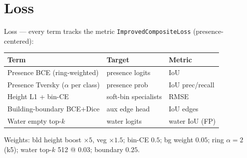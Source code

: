 \documentclass[aspectratio=169,11pt]{beamer}
\newcommand{\code}[1]{\texttt{\small #1}}
\begin{document}
\section{Loss}

\begin{frame}{Loss --- every term tracks the metric}
  \code{ImprovedCompositeLoss} (presence-centered):
  \begin{center}\small
  \begin{tabular}{lll}
    \toprule
    Term & Target & Metric\\
    \midrule
    Presence BCE (ring-weighted) & presence logits & IoU\\
    Presence Tversky ($\alpha$ per class) & presence prob & IoU prec/recall\\
    Height L1 + bin-CE & soft-bin specialists & RMSE\\
    Building-boundary BCE+Dice & aux edge head & IoU edges\\
    Water empty top-$k$ & water logits & water IoU (FP)\\
    \bottomrule
  \end{tabular}
  \end{center}
  \footnotesize Weights: bld height boost $\times5$, veg $\times1.5$; bin-CE $0.5$;
  bg weight $0.05$; ring $\alpha{=}2$ (k5); water top-$k$ 512 @ $0.03$; boundary $0.25$.
\end{frame}
\end{document}
